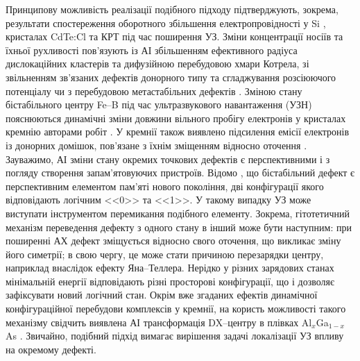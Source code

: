 Принципову можливість реалізації подібного підходу підтверджують, зокрема, результати спостереження оборотного
збільшення електропровідності у Si \cite{YOlikhTPL2011r}, кристалах CdTe:Cl \cite{YOlikh:UFG2016,YOlikh:SupMicr} та КРТ \cite{OlikhYFTP99,OlikhYFTP2000} під час поширення УЗ.
Зміни концентрації носіїв та їхньої рухливості пов'язують із АІ
збільшенням ефективного радіуса дислокаційних кластерів та дифузійною перебудовою хмари Котрела\cite{YOlikh:UFG2016,YOlikh:SupMicr},
зі звільненням зв'язаних дефектів донорного типу та сгладжування розсіюючого потенціалу \cite{OlikhYFTP99,OlikhYFTP2000}
чи з перебудовою метастабільних дефектів \cite{YOlikhTPL2011r}.
Зміною стану бістабільного центру Fe--B під час ультразвукового навантаження (УЗН) пояснюються динамічні зміни довжини вільного пробігу електронів у кристалах кремнію авторами робіт \cite{Ostrovskii2001,OlikhFTT}.
У кремнії також виявлено підсилення емісії електронів із донорних домішок, пов'язане з їхнім зміщенням відносно оточення \cite{Korotchenkov1995}.
Зауважимо, АІ зміни стану окремих точкових дефектів є перспективними і з погляду створення запам'ятовуючих пристроїв.
Відомо \cite{MetaUFN}, що бістабільний дефект є перспективним елементом пам'яті нового покоління,
дві конфігурації якого відповідають логічним <<0>> та <<1>>.
У такому випадку УЗ може виступати інструментом перемикання подібного елементу.
Зокрема, гітотетичний механізм переведення дефекту з одного стану в інший може бути наступним:
при поширенні АХ дефект зміщується відносно свого оточення, що викликає зміну його симетрії;
в свою чергу, це може стати причиною перезарядки центру, наприклад внаслідок ефекту Яна--Теллера.
Нерідко у різних зарядових станах мінімальній енергії відповідають різні просторові конфігурації, що і дозволяє зафіксувати новий логічний стан.
Окрім вже згаданих ефектів динамічної конфігураційної перебудови комплексів у кремнії, на користь
можливості такого механізму свідчить виявлена АІ трансформація DX--центру в плівках Al$_x$Ga$_{1-x}$As \cite{belyaev1994}.
Звичайно, подібний підхід вимагає вирішення задачі локалізації УЗ впливу на окремому дефекті.

